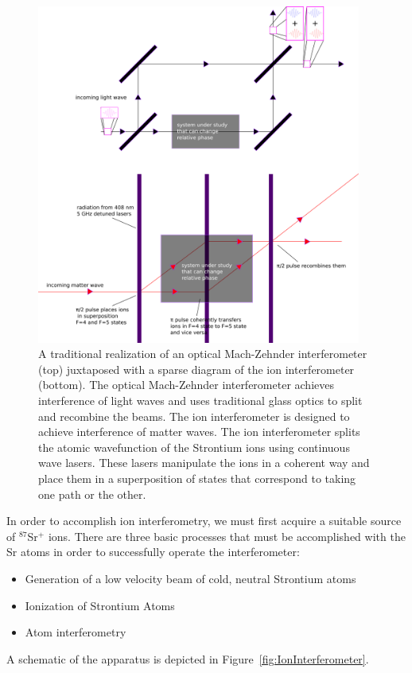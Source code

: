 \begin{figure}
\centerline{
\includegraphics[width=0.95\textwidth]{mach-zehnder}}
\caption[Optical and matterwave Mach-Zehnder interferometers]{\label{mach-zehnder-fig}A traditional realization of an optical Mach-Zehnder interferometer (top) juxtaposed with a sparse diagram of the ion interferometer (bottom). The optical Mach-Zehnder interferometer achieves interference of light waves and uses traditional glass optics to split and recombine the beams. The ion interferometer is designed to achieve interference of matter waves. The ion interferometer splits the atomic wavefunction of the Strontium ions using continuous wave lasers. These lasers manipulate the ions in a coherent way and place them in a superposition of states that correspond to taking one path or the other.}
\end{figure}

In order to accomplish ion interferometry, we must first acquire a suitable source of $^{87}$Sr$^+$ ions. There are three basic processes that must be accomplished with the Sr atoms in order to successfully operate the interferometer: 
\begin{itemize}
\item Generation of a low velocity beam of cold, neutral Strontium atoms   
\item Ionization of Strontium Atoms
\item Atom interferometry
\end{itemize} 
A schematic of the apparatus is depicted in Figure~\ref{fig:IonInterferometer}.

